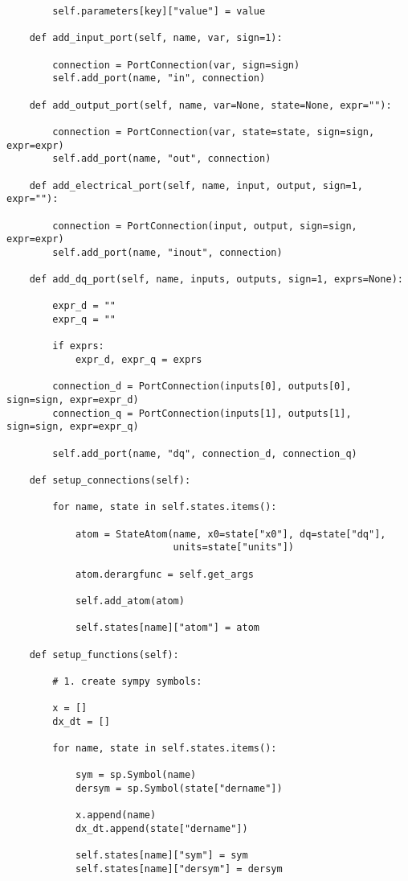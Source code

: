 \begin{lstlisting}
        self.parameters[key]["value"] = value

    def add_input_port(self, name, var, sign=1):

        connection = PortConnection(var, sign=sign)
        self.add_port(name, "in", connection)

    def add_output_port(self, name, var=None, state=None, expr=""):

        connection = PortConnection(var, state=state, sign=sign, expr=expr)
        self.add_port(name, "out", connection)

    def add_electrical_port(self, name, input, output, sign=1, expr=""):

        connection = PortConnection(input, output, sign=sign, expr=expr)
        self.add_port(name, "inout", connection)

    def add_dq_port(self, name, inputs, outputs, sign=1, exprs=None):

        expr_d = ""
        expr_q = ""

        if exprs:
            expr_d, expr_q = exprs

        connection_d = PortConnection(inputs[0], outputs[0], sign=sign, expr=expr_d)
        connection_q = PortConnection(inputs[1], outputs[1], sign=sign, expr=expr_q)

        self.add_port(name, "dq", connection_d, connection_q)

    def setup_connections(self):

        for name, state in self.states.items():

            atom = StateAtom(name, x0=state["x0"], dq=state["dq"],
                             units=state["units"])

            atom.derargfunc = self.get_args

            self.add_atom(atom)

            self.states[name]["atom"] = atom

    def setup_functions(self):

        # 1. create sympy symbols:

        x = []
        dx_dt = []

        for name, state in self.states.items():

            sym = sp.Symbol(name)
            dersym = sp.Symbol(state["dername"])

            x.append(name)
            dx_dt.append(state["dername"])

            self.states[name]["sym"] = sym
            self.states[name]["dersym"] = dersym


\end{lstlisting}
